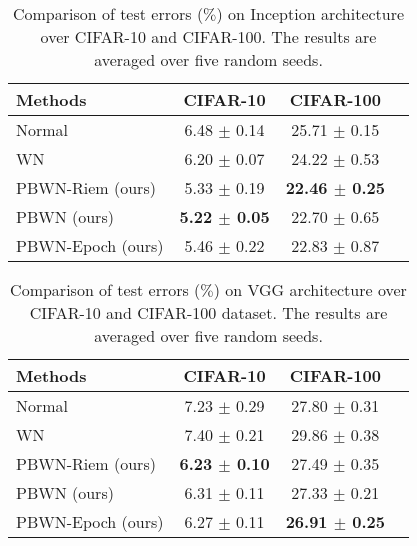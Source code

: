\documentclass[twocolumn]{article}
\begin{document}
\begin{table}[t]
\caption{Comparison of test errors ($\%$) on Inception architecture over CIFAR-10 and CIFAR-100. The results are averaged over five random seeds.}
\label{table:BN-Inception}
\vskip 0.0in
\begin{center}
\begin{small}
\begin{tabular}{lccr}
\hline
Methods & CIFAR-10 & CIFAR-100   \\
\hline
Normal     & 6.48 $\pm$ 0.14    & 25.71 $\pm$ 0.15     \\
WN	  & 6.20 $\pm$ 0.07       &  24.22 $\pm$ 0.53  \\
PBWN-Riem	(ours)  & 5.33 $\pm$ 0.19  & \textbf{22.46 $\pm$ 0.25} \\
PBWN	(ours)  & \textbf{5.22 $\pm$ 0.05}     & 22.70 $\pm$ 0.65 \\
PBWN-Epoch (ours)	& 5.46 $\pm$ 0.22 & 22.83 $\pm$ 0.87 \\
\hline
\end{tabular}
\end{small}
\end{center}
   \vspace{-0.15in}
\end{table}


\begin{table}[t]
\caption{Comparison of test errors ($\%$) on VGG architecture over CIFAR-10 and CIFAR-100 dataset. The results are averaged over five random seeds.}
\label{table:VGG}
\vskip 0.0in
\begin{center}
\begin{small}
\begin{tabular}{lccr}
\hline
Methods & CIFAR-10 & CIFAR-100   \\
\hline
Normal     & 7.23 $\pm$ 0.29 & 27.80 $\pm$ 0.31    \\
WN	  & 7.40 $\pm$ 0.21 &   29.86 $\pm$ 0.38  \\
PBWN-Riem	(ours)  & \textbf{6.23 $\pm$ 0.10} & 27.49 $\pm$ 0.35 \\
PBWN	(ours)  & 6.31 $\pm$ 0.11 & 27.33 $\pm$ 0.21 \\
PBWN-Epoch (ours)	  & 6.27 $\pm$ 0.11 & \textbf{26.91 $\pm$ 0.25} \\
\hline
\end{tabular}
\end{small}
\end{center}
   \vspace{-0.15in}
\end{table}
\end{document}

